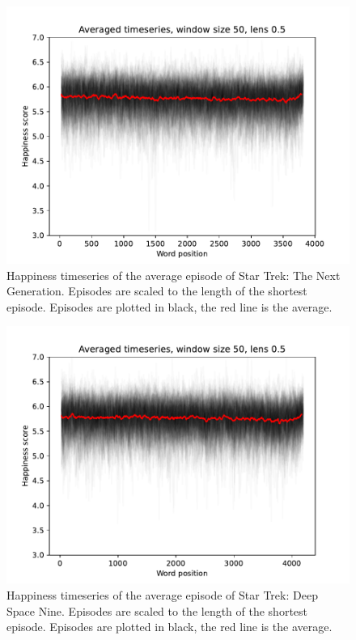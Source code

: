 \begin{figure}
    \centering
    \includegraphics[width=\columnwidth]{figures/localized/average_episode_tng.pdf}
    \caption{Happiness timeseries of the average episode of Star Trek: The Next Generation. Episodes are scaled to the length of the shortest episode. Episodes are plotted in black, the red line is the average.}
    \label{fig:average_episode_tng}
\end{figure}

\begin{figure}
    \centering
    \includegraphics[width=\columnwidth]{figures/localized/average_episode_ds9.pdf}
    \caption{Happiness timeseries of the average episode of Star Trek: Deep Space Nine. Episodes are scaled to the length of the shortest episode. Episodes are plotted in black, the red line is the average.}
    \label{fig:average_episode_ds9}
\end{figure}

